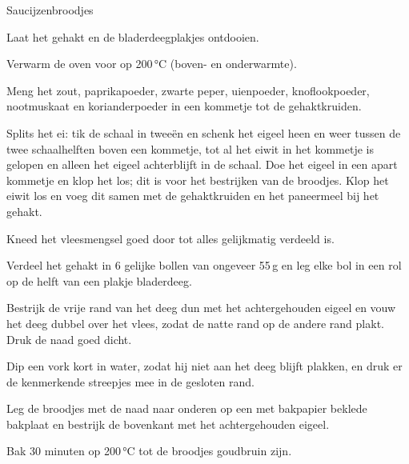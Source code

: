 \begin{recipe}{Saucijzenbroodjes}
\begin{steps}
  \item Laat het gehakt en de bladerdeegplakjes ontdooien.
  \item Verwarm de oven voor op 200\,°C (boven- en onderwarmte).
  \item Meng het zout, paprikapoeder, zwarte peper, uienpoeder, knoflookpoeder,
        nootmuskaat en korianderpoeder in een kommetje tot de gehaktkruiden.
  \item Splits het ei: tik de schaal in tweeën en schenk het eigeel heen en
        weer tussen de twee schaalhelften boven een kommetje, tot al het
        eiwit in het kommetje is gelopen en alleen het eigeel achterblijft in
        de schaal. Doe het eigeel in een apart kommetje en klop het los; dit
        is voor het bestrijken van de broodjes. Klop het eiwit los en voeg
        dit samen met de gehaktkruiden en het paneermeel bij het gehakt.
  \item Kneed het vleesmengsel goed door tot alles gelijkmatig verdeeld is.
  \item Verdeel het gehakt in 6 gelijke bollen van ongeveer 55\,g en leg elke
        bol in een rol op de helft van een plakje bladerdeeg.
  \item Bestrijk de vrije rand van het deeg dun met het achtergehouden eigeel
        en vouw het deeg dubbel over het vlees, zodat de natte rand op de
        andere rand plakt. Druk de naad goed dicht.
  \item Dip een vork kort in water, zodat hij niet aan het deeg blijft
        plakken, en druk er de kenmerkende streepjes mee in de gesloten
        rand.
  \item Leg de broodjes met de naad naar onderen op een met bakpapier beklede
        bakplaat en bestrijk de bovenkant met het achtergehouden eigeel.
  \item Bak 30 minuten op 200\,°C tot de broodjes goudbruin zijn.
\end{steps}

\end{recipe}
